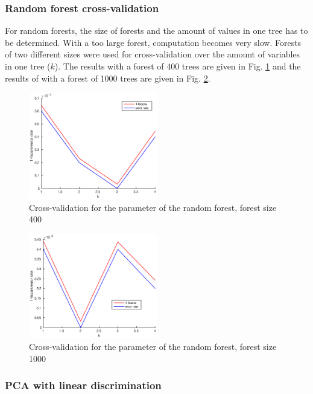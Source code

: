 \documentclass[twoside]{article}
\begin{document}
\begin{multicols}{2}
\subsubsection{Random forest cross-validation}

For random forests, the size of forests and the amount of values in one tree has to be determined.
With a too large forest, computation becomes very slow. Forests of two different sizes were used
for cross-validation over the amount of variables in one tree ($k$). The results with a forest of 400
trees are given in Fig. \ref{fig:RF400crossval} and the results of with a forest of 1000 trees
are given in Fig. \ref{fig:RF1000crossval}.

\begin{figure}[H]
\centering
\includegraphics[width=0.5\textwidth]{randforcrossval400}
\caption{Cross-validation for the parameter of the random forest, forest size 400}
\label{fig:RF400crossval}
\end{figure}

\begin{figure}[H]
\centering
\includegraphics[width=0.5\textwidth]{randforcrossval1000}
\caption{Cross-validation for the parameter of the random forest, forest size 1000}
\label{fig:RF1000crossval}
\end{figure}

\subsubsection{PCA with linear discrimination}


\end{multicols}
\end{document}

